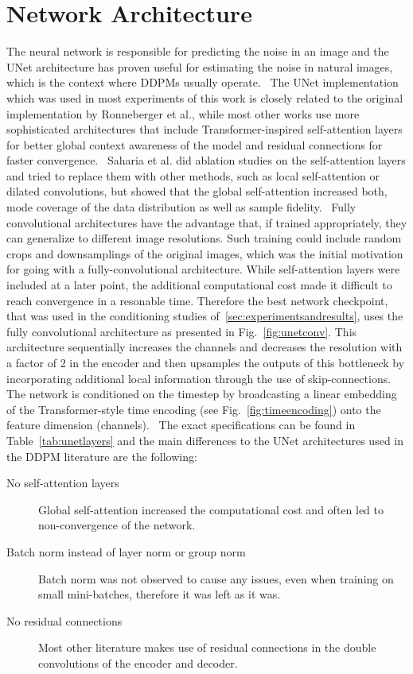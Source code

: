 \section{Network Architecture}
The neural network is responsible for predicting the noise in an image and the UNet architecture has proven useful for estimating the noise in natural images, which is the context where DDPMs usually operate.~\autocite{ronneberger2015unet,ho2020denoising} The UNet implementation which was used in most experiments of this work is closely related to the original implementation by Ronneberger et al., while most other works use more sophisticated architectures that include Transformer-inspired self-attention layers for better global context awareness of the model and residual connections for faster convergence.~\autocite{vaswani2017attention,he2015deep} Saharia et al. did ablation studies on the self-attention layers and tried to replace them with other methods, such as local self-attention or dilated convolutions, but showed that the global self-attention increased both, mode coverage of the data distribution as well as sample fidelity.~\autocite{saharia2022palette} Fully convolutional architectures have the advantage that, if trained appropriately, they can generalize to different image resolutions. Such training could include random crops and downsamplings of the original images, which was the initial motivation for going with a fully-convolutional architecture. While self-attention layers were included at a later point, the additional computational cost made it difficult to reach convergence in a resonable time. Therefore the best network checkpoint, that was used in the conditioning studies of~\ref{sec:experimentsandresults}, uses the fully convolutional architecture as presented in Fig.~\ref{fig:unetconv}. This architecture sequentially increases the channels and decreases the resolution with a factor of 2 in the encoder and then upsamples the outputs of this bottleneck by incorporating additional local information through the use of skip-connections. The network is conditioned on the timestep by broadcasting a linear embedding of the Transformer-style time encoding (see Fig.~\ref{fig:timeencoding}) onto the feature dimension (channels).~\autocite{vaswani2017attention} The exact specifications can be found in Table~\ref{tab:unetlayers} and the main differences to the UNet architectures used in the DDPM literature are the following:
\begin{description}
    \item[No self-attention layers] Global self-attention increased the computational cost and often led to non-convergence of the network.
    \item[Batch norm instead of layer norm or group norm] Batch norm was not observed to cause any issues, even when training on small mini-batches, therefore it was left as it was.
    \item[No residual connections] Most other literature makes use of residual connections in the double convolutions of the encoder and decoder.
\end{description}
